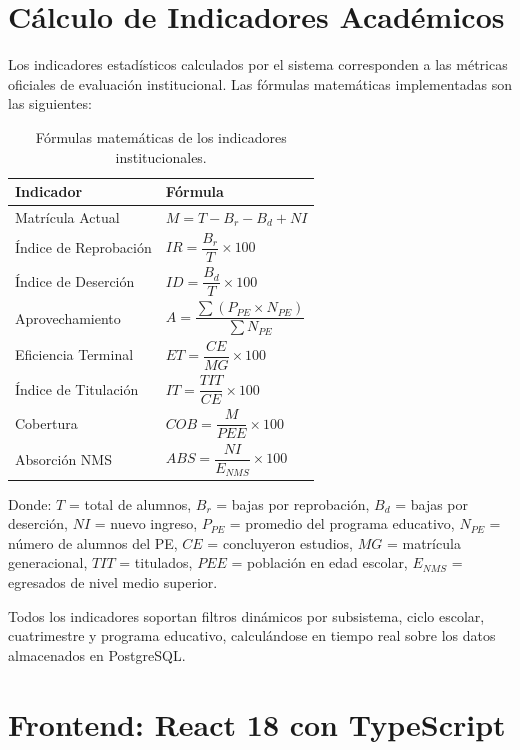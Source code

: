 \section{Cálculo de Indicadores Académicos}

Los indicadores estadísticos calculados por el sistema corresponden a las métricas oficiales de evaluación institucional. Las fórmulas matemáticas implementadas son las siguientes:

\begin{table}[H]
\centering
\begin{tabular}{|l|l|}
\hline
\textbf{Indicador} & \textbf{Fórmula} \\
\hline
Matrícula Actual & $M = T - B_r - B_d + NI$ \\
\hline
Índice de Reprobación & $IR = \dfrac{B_r}{T} \times 100$ \\
\hline
Índice de Deserción & $ID = \dfrac{B_d}{T} \times 100$ \\
\hline
Aprovechamiento & $A = \dfrac{\sum (P_{PE} \times N_{PE})}{\sum N_{PE}}$ \\
\hline
Eficiencia Terminal & $ET = \dfrac{CE}{MG} \times 100$ \\
\hline
Índice de Titulación & $IT = \dfrac{TIT}{CE} \times 100$ \\
\hline
Cobertura & $COB = \dfrac{M}{PEE} \times 100$ \\
\hline
Absorción NMS & $ABS = \dfrac{NI}{E_{NMS}} \times 100$ \\
\hline
\end{tabular}
\caption{Fórmulas matemáticas de los indicadores institucionales.}
\end{table}

Donde: $T$ = total de alumnos, $B_r$ = bajas por reprobación, $B_d$ = bajas por deserción, $NI$ = nuevo ingreso, $P_{PE}$ = promedio del programa educativo, $N_{PE}$ = número de alumnos del PE, $CE$ = concluyeron estudios, $MG$ = matrícula generacional, $TIT$ = titulados, $PEE$ = población en edad escolar, $E_{NMS}$ = egresados de nivel medio superior.

Todos los indicadores soportan filtros dinámicos por subsistema, ciclo escolar, cuatrimestre y programa educativo, calculándose en tiempo real sobre los datos almacenados en PostgreSQL.

\section{Frontend: React 18 con TypeScript}

